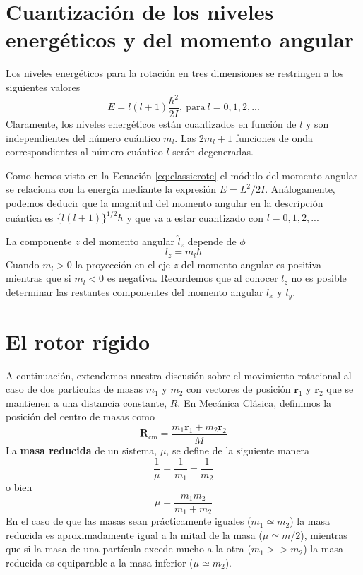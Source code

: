 \documentclass{tufte-handout}
\begin{document}
\section{Cuantización de los niveles energéticos y
del momento angular}
Los niveles energéticos para la rotación en tres 
dimensiones se restringen a los siguientes valores
\begin{equation}
    E=l(l+1)\frac{\hbar^2}{2I}, 
    \mathrm{~ para~}l=0,1,2,...
\end{equation}
Claramente, los niveles energéticos están cuantizados 
en función de $l$ y son independientes del número 
cuántico $m_l$. Las $2m_l+1$ funciones de onda
correspondientes al número cuántico $l$ serán 
degeneradas.

Como hemos visto en la Ecuación \ref{eq:classicrote} el 
módulo del momento angular se relaciona con la energía
mediante la expresión $E=L^2/2I$. Análogamente, podemos
deducir que la magnitud del momento angular en la 
descripción cuántica es $\{l(l+1)\}^{1/2}\hbar$ y que va
a estar cuantizado con $l=0,1,2,...$

La componente $z$ del momento angular
$\hat{l}_z$ depende de $\phi$ \begin{equation}
    l_z=m_l\hbar
    \label{eq:lz}
\end{equation}
Cuando $m_l>0$ la proyección en el eje $z$ del momento
angular  es positiva mientras que si $m_l<0$  es negativa.
Recordemos que al conocer $l_z$ no es posible determinar 
las restantes componentes del momento angular $l_x$ y $l_y$.

\section{El rotor rígido}
A continuación, extendemos nuestra discusión sobre el 
movimiento rotacional al caso de dos partículas de masas 
$m_1$ y $m_2$ con vectores de posición $\mathbf{r}_1$ y 
$\mathbf{r}_2$ que se mantienen a una distancia constante,
$R$. En Mecánica Clásica, definimos la posición del centro
de masas como 
\begin{equation}
    \mathbf{R}_\mathrm{cm}= \frac{m_1\mathbf{r}_1+m_2\mathbf{r}_2}{M}
\end{equation}
La \textbf{masa reducida} de un sistema, $\mu$, se define
de la siguiente manera
\begin{equation}
    \frac{1}{\mu}=\frac{1}{m_1}+\frac{1}{m_2}
\end{equation}
o bien
\begin{equation}
    \mu=\frac{m_1m_2}{m_1+m_2}
\end{equation}
En el caso de que las masas sean prácticamente iguales 
($m_1\simeq m_2$) la masa reducida es aproximadamente 
igual a la mitad de la masa ($\mu\simeq m/2$), mientras
que si la masa de una partícula excede mucho a la otra
($m_1>>m_2$) la masa reducida es equiparable
a la masa inferior ($\mu\simeq m_2$).
\end{document}

